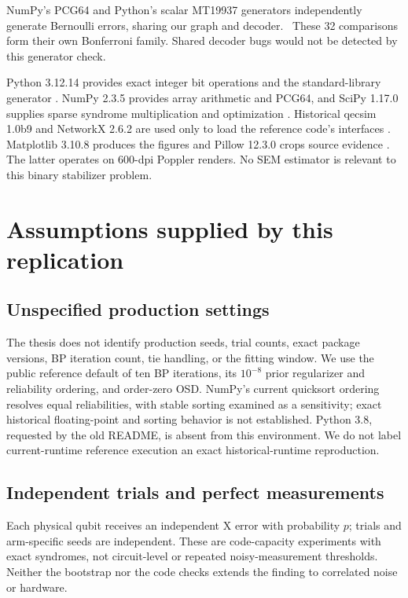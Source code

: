 NumPy's PCG64 and Python's scalar MT19937 generators independently generate Bernoulli errors, sharing our graph and decoder. \GeneratorStatus\ These 32 comparisons form their own Bonferroni family. Shared decoder bugs would not be detected by this generator check.

Python 3.12.14 provides exact integer bit operations and the standard-library generator \citep{python}. NumPy 2.3.5 provides array arithmetic and PCG64, and SciPy 1.17.0 supplies sparse syndrome multiplication and optimization \citep{numpy,scipy}. Historical qecsim 1.0b9 and NetworkX 2.6.2 are used only to load the reference code's interfaces \citep{qecsim,networkx}. Matplotlib 3.10.8 produces the figures and Pillow 12.3.0 crops source evidence \citep{matplotlib,pillow}. The latter operates on 600-dpi Poppler renders. No SEM estimator is relevant to this binary stabilizer problem.

\section{Assumptions supplied by this replication}
\subsection{Unspecified production settings}
The thesis does not identify production seeds, trial counts, exact package versions, BP iteration count, tie handling, or the fitting window. We use the public reference default of ten BP iterations, its $10^{-8}$ prior regularizer and reliability ordering, and order-zero OSD. NumPy's current quicksort ordering resolves equal reliabilities, with stable sorting examined as a sensitivity; exact historical floating-point and sorting behavior is not established. Python 3.8, requested by the old README, is absent from this environment. We do not label current-runtime reference execution an exact historical-runtime reproduction.

\subsection{Independent trials and perfect measurements}
Each physical qubit receives an independent X error with probability $p$; trials and arm-specific seeds are independent. These are code-capacity experiments with exact syndromes, not circuit-level or repeated noisy-measurement thresholds. Neither the bootstrap nor the code checks extends the finding to correlated noise or hardware.

